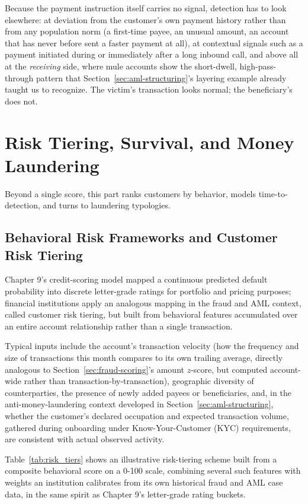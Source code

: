 \documentclass[../ai_in_finance]{subfiles}
\begin{document}
Because the payment instruction itself carries no signal, detection has to look elsewhere: at deviation from the customer's own payment history rather than from any population norm (a first-time payee, an unusual amount, an account that has never before sent a faster payment at all), at contextual signals such as a payment initiated during or immediately after a long inbound call, and above all at the \emph{receiving} side, where mule accounts show the short-dwell, high-pass-through pattern that Section~\ref{sec:aml-structuring}'s layering example already taught us to recognize. The victim's transaction looks normal; the beneficiary's does not.

\section{Risk Tiering, Survival, and Money Laundering}

Beyond a single score, this part ranks customers by behavior, models time-to-detection, and turns to laundering typologies.

\subsection{Behavioral Risk Frameworks and Customer Risk Tiering}
\label{sec:risk-tiering}

Chapter 9's credit-scoring model mapped a continuous predicted default probability into discrete letter-grade ratings for portfolio and pricing purposes; financial institutions apply an analogous mapping in the fraud and AML context, called customer risk tiering, but built from behavioral features accumulated over an entire account relationship rather than a single transaction.

Typical inputs include the account's transaction velocity (how the frequency and size of transactions this month compares to its own trailing average, directly analogous to Section~\ref{sec:fraud-scoring}'s amount $z$-score, but computed account-wide rather than transaction-by-transaction), geographic diversity of counterparties, the presence of newly added payees or beneficiaries, and, in the anti-money-laundering context developed in Section~\ref{sec:aml-structuring}, whether the customer's declared occupation and expected transaction volume, gathered during onboarding under Know-Your-Customer (KYC) requirements, are consistent with actual observed activity.

Table~\ref{tab:risk_tiers} shows an illustrative risk-tiering scheme built from a composite behavioral score on a 0-100 scale, combining several such features with weights an institution calibrates from its own historical fraud and AML case data, in the same spirit as Chapter 9's letter-grade rating buckets.
\end{document}
